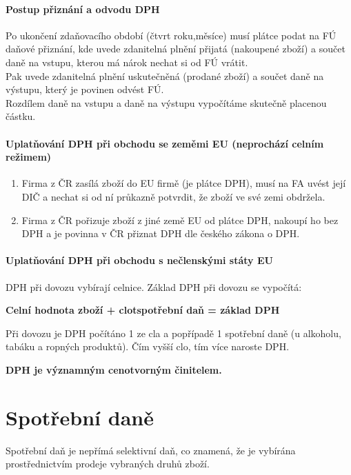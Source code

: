 \paragraph{Postup přiznání a odvodu DPH}
Po ukončení zdaňovacího období (čtvrt roku,měsíce) musí plátce podat na FÚ daňové přiznání, kde uvede zdanitelná plnění přijatá (nakoupené zboží) a součet daně na vstupu, kterou má nárok nechat si od FÚ vrátit. \\
Pak uvede zdanitelná plnění uskutečněná (prodané zboží) a součet daně na výstupu, který je povinen odvést FÚ. \\
Rozdílem daně na vstupu a daně na výstupu vypočítáme skutečně placenou částku.

\paragraph{Uplatňování DPH při obchodu se zeměmi EU (neprochází celním režimem)}
\begin{enumerate}
    \item Firma z ČR zasílá zboží do EU firmě (je plátce DPH), musí na FA uvést její DIČ a nechat si od ní průkazně potvrdit, že zboží ve své zemi obdržela.
    \item Firma z ČR pořizuje zboží z jiné země EU od plátce DPH, nakoupí ho bez DPH a je povinna v ČR přiznat DPH dle českého zákona o DPH.
\end{enumerate}

\paragraph{Uplatňování DPH při obchodu s nečlenskými státy EU}
DPH při dovozu vybírají celnice. Základ DPH při dovozu se vypočítá:
\begin{center}
    \textbf{Celní hodnota zboží + clotspotřební daň = základ DPH}
\end{center}

Při dovozu je DPH počítáno 1 ze cla a popřípadě 1 spotřební daně (u alkoholu, tabáku a ropných produktů). Čím vyšší clo, tím více naroste DPH.

\textbf{DPH je významným cenotvorným činitelem.}

\section*{Spotřební daně}
Spotřební daň je nepřímá selektivní daň, co znamená, že je vybírána prostřednictvím prodeje vybraných druhů zboží.

